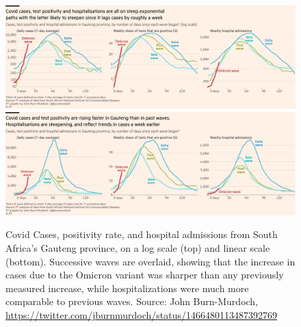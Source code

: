 \documentclass[article]{jdssv}\usepackage[]{graphicx}\usepackage[]{color}
\begin{document}
\begin{figure}\centering
\includegraphics[width=\linewidth]{ft-waves}\\
\includegraphics[width=\linewidth]{ft-waves-linear}
\caption{Covid Cases, positivity rate, and hospital admissions from South Africa's Gauteng province, on a log scale (top) and linear scale (bottom). Successive waves are overlaid, showing that the increase in cases due to the Omicron variant was sharper than any previously measured increase, while hospitalizations were much more comparable to previous waves. Source: John Burn-Murdoch, \url{https://twitter.com/jburnmurdoch/status/1466480113487392769}}
\label{fig:ft-waves}
\end{figure}
\end{document}
